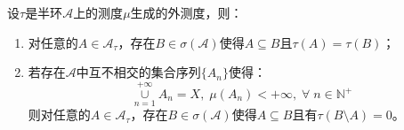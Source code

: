 \begin{theorem}\label{theo:DifOfAtauAndSigmaA}
	设$\tau$是半环$\mathscr{A}$上的测度$\mu$生成的外测度，则：
	\begin{enumerate}
		\item 对任意的$A\in\mathscr{A}_\tau$，存在$B\in\sigma(\mathscr{A})$使得$A\subseteq B$且$\tau(A)=\tau(B)$；
		\item 若存在$\mathscr{A}$中互不相交的集合序列$\{A_n\}$使得：
		\begin{equation*}
			\underset{n=1}{\overset{+\infty}{\cup}}A_n=X,\;\mu(A_n)<+\infty,\;\forall\;n\in\mathbb{N}^+
		\end{equation*}
		则对任意的$A\in\mathscr{A}_\tau$，存在$B\in\sigma(\mathscr{A})$使得$A\subseteq B$且有$\tau(B\setminus A)=0$。
	\end{enumerate}
\end{theorem}
